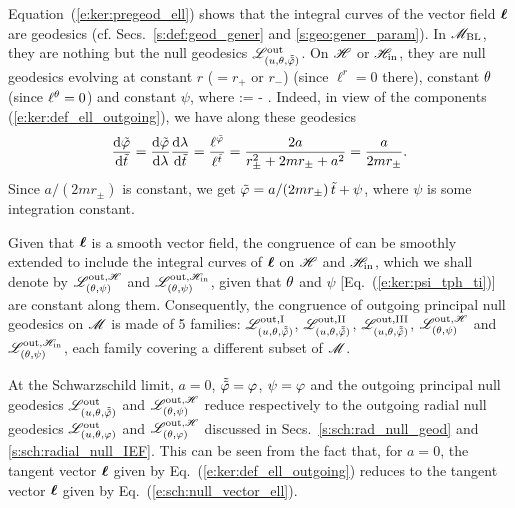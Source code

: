 \ee
Equation~(\ref{e:ker:pregeod_ell}) shows that the integral curves of the
vector field $\bm{\ell}$ are geodesics (cf. Secs.~\ref{s:def:geod_gener} and \ref{s:geo:gener_param}).
In $\mathscr{M}_{\rm BL}$, they are nothing but the null geodesics $\mathscr{L}^{\rm out}_{(u,\theta,\tilde{{\tilde\varphi}})}$.
On $\mathscr{H}$ or $\mathscr{H}_{\rm in}$, they are null geodesics evolving at constant $r$ ($=r_+$ or $r_-$)
(since $\ell^r = 0$ there),
constant $\theta$ (since $\ell^\theta = 0$) and constant $\psi$,
where
\be \label{e:ker:psi_tph_ti}
    \psi := \tph -  \ti .
\ee
Indeed, in view of the components (\ref{e:ker:def_ell_outgoing}), we have along these geodesics
\[
    \frac{\mathrm{d}{\tilde\varphi}}{\mathrm{d}{\tilde t}} = \frac{\mathrm{d}{\tilde\varphi}}{\mathrm{d}\lambda} \frac{\mathrm{d}\lambda}{\mathrm{d}{\tilde t}}
    = \frac{\ell^{\tilde\varphi}}{\ell^{\tilde t}} = \frac{2a}{r_\pm^2 + 2 m r_\pm + a^2}
   = \frac{a}{2 m r_\pm}.
\]
Since $a/(2m r_\pm)$ is constant, we get
${\tilde\varphi} = a/(2m r_\pm)\,  {\tilde t} + \psi$, where $\psi$ is some integration constant.

\begin{prop}
Given that $\bm{\ell}$ is a smooth vector field, the congruence of  can be smoothly extended to include the integral curves of $\bm{\ell}$ on $\mathscr{H}$ and
$\mathscr{H}_{\rm in}$, which we shall denote by
$\mathscr{L}^{{\rm out},\mathscr{H}}_{(\theta,\psi)}$ and $\mathscr{L}^{{\rm out},\mathscr{H}_{\rm in}}_{(\theta,\psi)}$,
given that $\theta$ and $\psi$ [Eq.~(\ref{e:ker:psi_tph_ti})] are constant
along them. Consequently, the congruence of outgoing principal null
geodesics on $\mathscr{M}$ is made of 5 families:
$\mathscr{L}^{\rm out,I}_{(u,\theta,\tilde{{\tilde\varphi}})}$,
$\mathscr{L}^{\rm out,II}_{(u,\theta,\tilde{{\tilde\varphi}})}$,
$\mathscr{L}^{\rm out,III}_{(u,\theta,\tilde{{\tilde\varphi}})}$,
$\mathscr{L}^{{\rm out},\mathscr{H}}_{(\theta,\psi)}$ and $\mathscr{L}^{{\rm out},\mathscr{H}_{\rm in}}_{(\theta,\psi)}$,
each family covering a different subset of $\mathscr{M}$.
\end{prop}

\begin{remark}
At the Schwarzschild limit, $a=0$, $\tilde{{\tilde\varphi}} = \varphi$, $\psi=\varphi$ and the
outgoing principal null geodesics
$\mathscr{L}^{\rm out}_{(u,\theta,\tilde{{\tilde\varphi}})}$ and
$\mathscr{L}^{{\rm out},\mathscr{H}}_{(\theta,\psi)}$ reduce respectively to the
outgoing radial null geodesics
$\mathscr{L}^{\rm out}_{(u,\theta,\varphi)}$ and
$\mathscr{L}^{{\rm out},\mathscr{H}}_{(\theta,\varphi)}$ discussed in Secs.~\ref{s:sch:rad_null_geod} and \ref{s:sch:radial_null_IEF}. This can be seen from the fact that, for $a=0$, the tangent vector
$\bm{\ell}$ given by Eq.~(\ref{e:ker:def_ell_outgoing}) reduces to the tangent
vector $\bm{\ell}$ given by Eq.~(\ref{e:sch:null_vector_ell}).
\end{remark}



